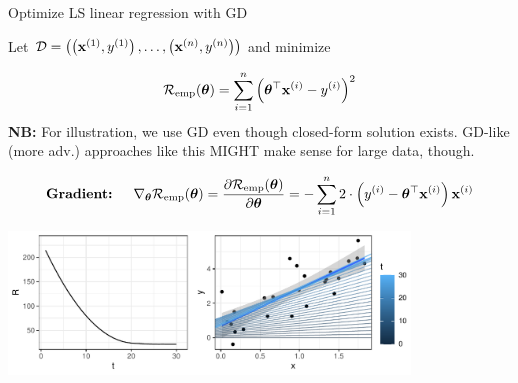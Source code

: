 \documentclass[11pt,compress,t,notes=noshow, xcolor=table]{beamer}
\begin{document}
\begin{vbframe}{Optimize LS linear regression with GD}

	\begin{footnotesize}

	Let $\mathcal{D} = \left( \left(\mathbf{x}^{(1)}, y^{(1)}\right), \ldots, \left(\mathbf{x}^{(n)}, y^{(n)}\right)\right)$ and minimize 

	$$
		\mathcal{R}_{\text{emp}}(\bm{\theta}) = \sum\limits_{i=1}^n \left(\bm{\theta}^\top \mathbf{x}^{(i)} - y^{(i)}\right)^2
	$$
	\textbf{NB: } For illustration, we use GD even though closed-form solution exists. GD-like (more adv.) approaches like this MIGHT make sense for large data, though.
	\end{footnotesize}
	
	\begin{footnotesize}
	\begin{eqnarray*}
	\textbf{Gradient: } && \nabla_{\bm{\theta}}\mathcal{R}_{\text{emp}}(\bm{\theta}) =  \frac{\partial \mathcal{R}_{\text{emp}}(\bm{\theta})}{\partial
	\bm{\theta}} = - \sum_{i=1}^n 2 \cdot \left(y^{(i)} - \bm{\theta}^{\top} \mathbf{x}^{(i)}\right) \mathbf{x}^{(i)} \\
	\end{eqnarray*}
	\end{footnotesize}


	\vspace*{-0.5cm}

	\begin{center}
	\includegraphics[width=0.8\textwidth]{figure_man/gradient_descent_lm.pdf}
	\end{center}

\end{vbframe}
\end{document}
